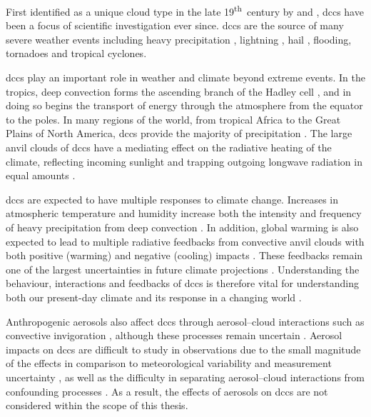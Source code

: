 First identified as a unique cloud type in the late 19\textsuperscript{th}~century by \citet{abercromby_identity_1887} and \citet{hildebrandsson_remarks_1887}, \acrshort{dcc}s have been a focus of scientific investigation ever since.
\acrshort{dcc}s are the source of many severe weather events \citep{matsudo_severe_2011, houze_chapter_2014} including heavy precipitation \citep{westra_future_2014}, lightning \citep{williams_radar_1992}, hail \citep{punge_hail_2016}, flooding, tornadoes and tropical cyclones.

\acrshort{dcc}s play an important role in weather and climate beyond extreme events.
In the tropics, deep convection forms the ascending branch of the Hadley cell \citep{riehl_heat_1958}, and in doing so begins the transport of energy through the atmosphere from the equator to the poles.
In many regions of the world, from tropical Africa to the Great Plains of North America, \acrshort{dcc}s provide the majority of precipitation \citep{feng_global_2021}.
The large anvil clouds of \acrshort{dcc}s have a mediating effect on the radiative heating of the climate, reflecting incoming sunlight and trapping outgoing longwave radiation in equal amounts \citep{ramanathan_cloud-radiative_1989, hartmann_effect_1992, hartmann_tropical_2016}.

\acrshort{dcc}s are expected to have multiple responses to climate change.
Increases in atmospheric temperature and humidity increase both the intensity and frequency of heavy precipitation from deep convection \citep[e.g.][]{allen_constraints_2002, trenberth_changing_2003, held_robust_2006}.
In addition, global warming is also expected to lead to multiple radiative feedbacks from convective anvil clouds with both positive (warming) and negative (cooling) impacts \citep{bony_clouds_2015}.
These feedbacks remain one of the largest uncertainties in future climate projections \citep{sherwood_assessment_2020}.
Understanding the behaviour, interactions and feedbacks of \acrshort{dcc}s is therefore vital for understanding both our present-day climate and its response in a changing world \citep{gasparini_opinion_2023}.

Anthropogenic aerosols also affect \acrshort{dcc}s through aerosol--cloud interactions such as convective invigoration \citep{khain2005aerosol, rosenfeld_flood_2008}, although these processes remain uncertain \citep{varble_opinion_2023}.
Aerosol impacts on \acrshort{dcc}s are difficult to study in observations due to the small magnitude of the effects in comparison to meteorological variability and measurement uncertainty \citep{grabowski_can_2018}, as well as the difficulty in separating aerosol--cloud interactions from confounding processes \citep{varble_erroneous_2018}.
As a result, the effects of aerosols on \acrshort{dcc}s are not considered within the scope of this thesis.

